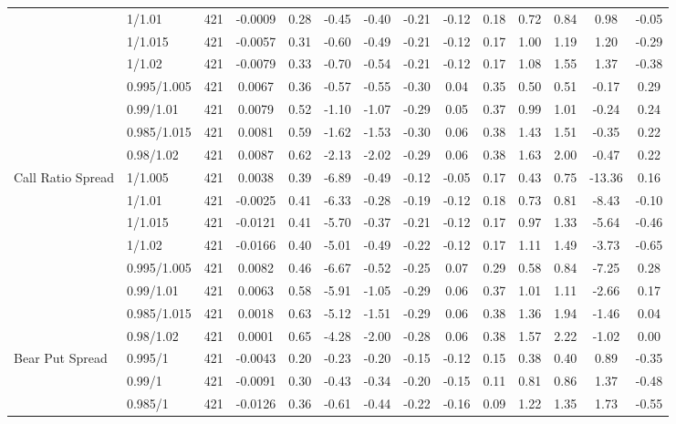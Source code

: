 \begin{tabular}{llcccccccccccc}
 & 1/1.01 & 421 & -0.0009 & 0.28 & -0.45 & -0.40 & -0.21 & -0.12 & 0.18 & 0.72 & 0.84 & 0.98 & -0.05 \\
 & 1/1.015 & 421 & -0.0057 & 0.31 & -0.60 & -0.49 & -0.21 & -0.12 & 0.17 & 1.00 & 1.19 & 1.20 & -0.29 \\
 & 1/1.02 & 421 & -0.0079 & 0.33 & -0.70 & -0.54 & -0.21 & -0.12 & 0.17 & 1.08 & 1.55 & 1.37 & -0.38 \\
 & 0.995/1.005 & 421 & 0.0067 & 0.36 & -0.57 & -0.55 & -0.30 & 0.04 & 0.35 & 0.50 & 0.51 & -0.17 & 0.29 \\
 & 0.99/1.01 & 421 & 0.0079 & 0.52 & -1.10 & -1.07 & -0.29 & 0.05 & 0.37 & 0.99 & 1.01 & -0.24 & 0.24 \\
 & 0.985/1.015 & 421 & 0.0081 & 0.59 & -1.62 & -1.53 & -0.30 & 0.06 & 0.38 & 1.43 & 1.51 & -0.35 & 0.22 \\
 & 0.98/1.02 & 421 & 0.0087 & 0.62 & -2.13 & -2.02 & -0.29 & 0.06 & 0.38 & 1.63 & 2.00 & -0.47 & 0.22 \\
Call Ratio Spread & 1/1.005 & 421 & 0.0038 & 0.39 & -6.89 & -0.49 & -0.12 & -0.05 & 0.17 & 0.43 & 0.75 & -13.36 & 0.16 \\
 & 1/1.01 & 421 & -0.0025 & 0.41 & -6.33 & -0.28 & -0.19 & -0.12 & 0.18 & 0.73 & 0.81 & -8.43 & -0.10 \\
 & 1/1.015 & 421 & -0.0121 & 0.41 & -5.70 & -0.37 & -0.21 & -0.12 & 0.17 & 0.97 & 1.33 & -5.64 & -0.46 \\
 & 1/1.02 & 421 & -0.0166 & 0.40 & -5.01 & -0.49 & -0.22 & -0.12 & 0.17 & 1.11 & 1.49 & -3.73 & -0.65 \\
 & 0.995/1.005 & 421 & 0.0082 & 0.46 & -6.67 & -0.52 & -0.25 & 0.07 & 0.29 & 0.58 & 0.84 & -7.25 & 0.28 \\
 & 0.99/1.01 & 421 & 0.0063 & 0.58 & -5.91 & -1.05 & -0.29 & 0.06 & 0.37 & 1.01 & 1.11 & -2.66 & 0.17 \\
 & 0.985/1.015 & 421 & 0.0018 & 0.63 & -5.12 & -1.51 & -0.29 & 0.06 & 0.38 & 1.36 & 1.94 & -1.46 & 0.04 \\
 & 0.98/1.02 & 421 & 0.0001 & 0.65 & -4.28 & -2.00 & -0.28 & 0.06 & 0.38 & 1.57 & 2.22 & -1.02 & 0.00 \\
Bear Put Spread & 0.995/1 & 421 & -0.0043 & 0.20 & -0.23 & -0.20 & -0.15 & -0.12 & 0.15 & 0.38 & 0.40 & 0.89 & -0.35 \\
 & 0.99/1 & 421 & -0.0091 & 0.30 & -0.43 & -0.34 & -0.20 & -0.15 & 0.11 & 0.81 & 0.86 & 1.37 & -0.48 \\
 & 0.985/1 & 421 & -0.0126 & 0.36 & -0.61 & -0.44 & -0.22 & -0.16 & 0.09 & 1.22 & 1.35 & 1.73 & -0.55 \\

\end{tabular}
